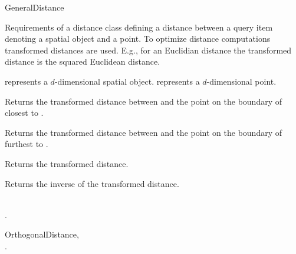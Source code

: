 

\begin{ccRefConcept}{GeneralDistance}


\ccDefinition

Requirements of a distance class defining a distance between a query item
denoting a spatial object and a point.
To optimize distance computations transformed distances are used.
E.g., for an Euclidian distance the transformed distance is the squared Euclidean distance.


\ccParameters

 represents a
$d$-dimensional
spatial object.
 represents a $d$-dimensional point.

\ccTypes



\ccOperations


{Returns the transformed distance between  and
the point on the boundary of  closest to .}

{Returns the transformed distance between  and
the point on the boundary of  furthest to .}

 {Returns the transformed distance.}

 {Returns the inverse of the transformed distance.}

\ccHasModels

\\
.

\ccSeeAlso

OrthogonalDistance,
\\
.

\end{ccRefConcept}


